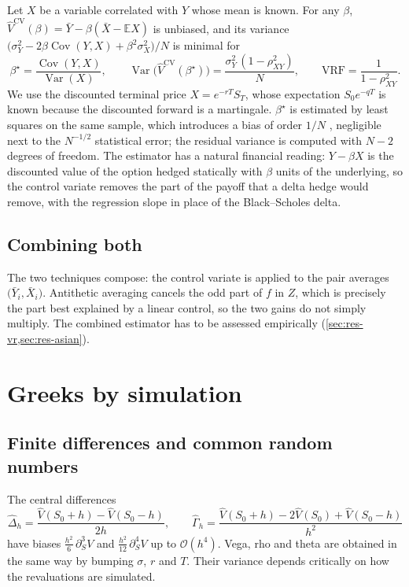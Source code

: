 \documentclass[11pt,a4paper]{article}
\newcommand{\E}{\mathbb{E}}
\newcommand{\Var}{\operatorname{Var}}
\newcommand{\Cov}{\operatorname{Cov}}
\newcommand{\1}{\mathbf{1}}
\theoremstyle{plain}
\theoremstyle{remark}
\begin{document}
Let $X$ be a variable correlated with $Y$ whose mean is known. For any $\beta$,
$\hat V^{\text{CV}}(\beta) = \bar Y - \beta (\bar X - \E X)$ is unbiased, and its variance
$\big(\sigma_Y^2 - 2\beta\Cov(Y,X) + \beta^2\sigma_X^2\big)/N$ is minimal for
\begin{equation}
  \beta^\star = \frac{\Cov(Y,X)}{\Var(X)}, \qquad
  \Var\big(\hat V^{\text{CV}}(\beta^\star)\big) = \frac{\sigma_Y^2\,(1 - \rho_{XY}^2)}{N}, \qquad
  \text{VRF} = \frac{1}{1-\rho_{XY}^2}.
  \label{eq:cv}
\end{equation}
We use the discounted terminal price $X = e^{-rT} S_T$, whose expectation $S_0 e^{-qT}$ is known because the
discounted forward is a martingale. $\beta^\star$ is estimated by least squares on the same sample, which
introduces a bias of order $1/N$ \citep[\S 4.1]{glasserman2003}, negligible next to the $N^{-1/2}$ statistical
error; the residual variance is computed with $N-2$ degrees of freedom. The estimator has a natural financial
reading: $Y - \beta X$ is the discounted value of the option hedged statically with $\beta$ units of the
underlying, so the control variate removes the part of the payoff that a delta hedge would remove, with the
regression slope in place of the Black--Scholes delta.

\subsection{Combining both}

The two techniques compose: the control variate is applied to the pair averages
$\big(\bar Y_i, \bar X_i\big)$. Antithetic averaging cancels the odd part of $f$ in $Z$, which is precisely the
part best explained by a linear control, so the two gains do not simply multiply. The combined estimator has to
be assessed empirically (\cref{sec:res-vr,sec:res-asian}).

\section{Greeks by simulation}\label{sec:greeks}

\subsection{Finite differences and common random numbers}

The central differences
\begin{equation}
  \hat\Delta_h = \frac{\hat V(S_0 + h) - \hat V(S_0 - h)}{2h}, \qquad
  \hat\Gamma_h = \frac{\hat V(S_0 + h) - 2\hat V(S_0) + \hat V(S_0 - h)}{h^2}
\end{equation}
have biases $\frac{h^2}{6}\,\partial_S^3 V$ and $\frac{h^2}{12}\,\partial_S^4 V$ up to $\mathcal{O}(h^4)$.
Vega, rho and theta are obtained in the same way by bumping $\sigma$, $r$ and $T$. Their variance depends
critically on how the revaluations are simulated.
\end{document}
